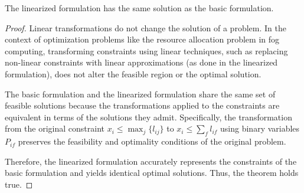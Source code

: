 \begin{theorem}
    The linearized formulation has the same solution as the basic formulation.
\end{theorem}
\begin{proof}
    Linear transformations do not change the solution of a problem. In the context of optimization problems like the resource allocation problem in fog computing, transforming constraints using linear techniques, such as replacing non-linear constraints with linear approximations (as done in the linearized formulation), does not alter the feasible region or the optimal solution.
    
    The basic formulation and the linearized formulation share the same set of feasible solutions because the transformations applied to the constraints are equivalent in terms of the solutions they admit. Specifically, the transformation from the original constraint \( x_i \leq \max_j \{l_{ij}\} \) to \( x_i \leq \sum_f l_{if} \) using binary variables \( P_{if} \) preserves the feasibility and optimality conditions of the original problem.
    
    Therefore, the linearized formulation accurately represents the constraints of the basic formulation and yields identical optimal solutions. Thus, the theorem holds true.
\end{proof}
